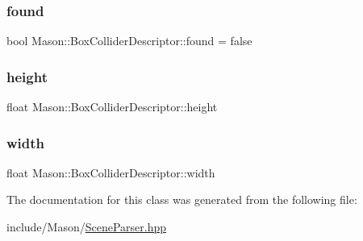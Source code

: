 \subsubsection{\texorpdfstring{found}{found}}
{\footnotesize\ttfamily bool Mason\+::\+Box\+Collider\+Descriptor\+::found = false}

\hypertarget{class_mason_1_1_box_collider_descriptor_a7ed17142f44ec7337d38b34674b9e292}{}\label{class_mason_1_1_box_collider_descriptor_a7ed17142f44ec7337d38b34674b9e292} 
\subsubsection{\texorpdfstring{height}{height}}
{\footnotesize\ttfamily float Mason\+::\+Box\+Collider\+Descriptor\+::height}

\hypertarget{class_mason_1_1_box_collider_descriptor_ae147e1798e9ef8855faaf51ce4bac9c4}{}\label{class_mason_1_1_box_collider_descriptor_ae147e1798e9ef8855faaf51ce4bac9c4} 
\subsubsection{\texorpdfstring{width}{width}}
{\footnotesize\ttfamily float Mason\+::\+Box\+Collider\+Descriptor\+::width}



The documentation for this class was generated from the following file\+:\begin{DoxyCompactItemize}
\item 
include/\+Mason/\hyperlink{_scene_parser_8hpp}{Scene\+Parser.\+hpp}\end{DoxyCompactItemize}
